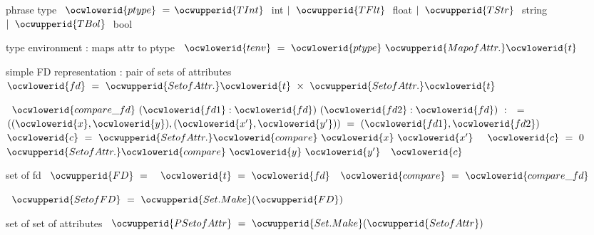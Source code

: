 \documentclass[12pt]{article}
\begin{document}
\ocwendcode{}\ocwindent{0.00em}
phrase type 
\ocweol
\label{rellens_types.ml:2362}%
\medskip
\ocwbegincode{}\ocwindent{0.00em}
~$\ocwlowerid{ptype}~=$\ocweol
\ocwindent{2.00em}
$\ocwupperid{TInt}~$\ocwbc{} int \ocwec{}\ocweol
\ocwindent{1.00em}
$\mid{}~\ocwupperid{TFlt}~$\ocwbc{} float \ocwec{}\ocweol
\ocwindent{1.00em}
$\mid{}~\ocwupperid{TStr}~$\ocwbc{} string \ocwec{}\ocweol
\ocwindent{1.00em}
$\mid{}~\ocwupperid{TBol}~$\ocwbc{} bool \ocwec{}\medskip

\ocwendcode{}\ocwindent{0.00em}
type environment : maps attr to ptype 
\ocweol
\label{rellens_types.ml:2502}%
\medskip
\ocwbegincode{}\ocwindent{0.00em}
~$\ocwlowerid{tenv}~=~\ocwlowerid{ptype}~\ocwupperid{MapofAttr.}\ocwlowerid{t}$\medskip

\ocwendcode{}\ocwindent{0.00em}
simple FD representation : pair of sets of attributes 
\ocweol
\label{rellens_types.ml:2593}%
\medskip
\ocwbegincode{}\ocwindent{0.00em}
~$\ocwlowerid{fd}~=~\ocwupperid{SetofAttr.}\ocwlowerid{t}~\times{}~\ocwupperid{SetofAttr.}\ocwlowerid{t}$\medskip

\label{rellens_types.ml:2630}%
\ocwindent{0.00em}
~$\ocwlowerid{compare\_fd}~(\ocwlowerid{fd1}:\ocwlowerid{fd})~(\ocwlowerid{fd2}:\ocwlowerid{fd})~:~$~=~\ocweol
\ocwindent{1.00em}
~$((\ocwlowerid{x},\ocwlowerid{y}),(\ocwlowerid{x'},\ocwlowerid{y'}))~=~(\ocwlowerid{fd1},\ocwlowerid{fd2})~$\ocweol
\ocwindent{1.00em}
~$\ocwlowerid{c}~=~\ocwupperid{SetofAttr.}\ocwlowerid{compare}~\ocwlowerid{x}~\ocwlowerid{x'}~$\ocweol
\ocwindent{1.00em}
~$\ocwlowerid{c}~=~0~$\ocweol
\ocwindent{1.00em}
~$\ocwupperid{SetofAttr.}\ocwlowerid{compare}~\ocwlowerid{y}~\ocwlowerid{y'}$\ocweol
\ocwindent{1.00em}
~$\ocwlowerid{c}$\medskip

\ocwendcode{}\ocwindent{0.00em}
set of fd 
\ocweol
\label{rellens_types.ml:2813}%
\medskip
\ocwbegincode{}\ocwindent{0.00em}
~$\ocwupperid{FD}~=~$\ocweol
\ocwindent{1.00em}
~$\ocwlowerid{t}~=~\ocwlowerid{fd}$\ocweol
\ocwindent{1.00em}
~$\ocwlowerid{compare}~=~\ocwlowerid{compare\_fd}$\ocweol
\ocwindent{0.00em}
\medskip

\label{rellens_types.ml:2878}%
\ocwindent{0.00em}
~$\ocwupperid{SetofFD}~=~\ocwupperid{Set.Make}(\ocwupperid{FD})$\medskip

\ocwendcode{}\ocwindent{0.00em}
set of set of attributes 
\ocweol
\label{rellens_types.ml:2940}%
\medskip
\ocwbegincode{}\ocwindent{0.00em}
~$\ocwupperid{PSetofAttr}~=~\ocwupperid{Set.Make}(\ocwupperid{SetofAttr})$\medskip
\end{document}
